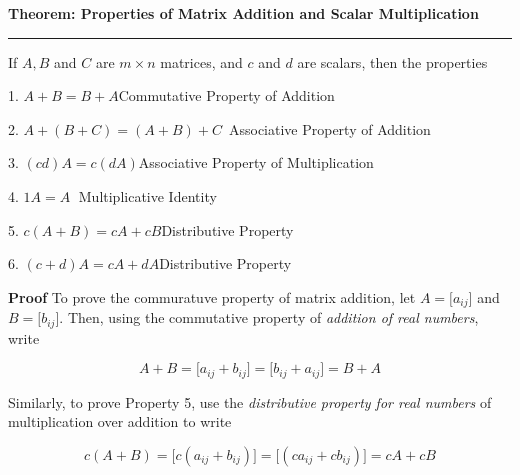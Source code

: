 \nopagenumbers
{\bf Theorem: Properties of Matrix Addition and Scalar Multiplication}
\vskip 1mm
\hrule

\vskip 6pt
If $A,B$ and $C$ are $m\times n$ matrices, and $c$ and $d$ are scalars, then the properties

\vskip 10pt
1. $A+B=B+A$\quad\quad\quad\quad\quad\quad\quad\quad Commutative Property of Addition

\vskip 6pt
2. $A+(B+C)=(A+B)+C$\quad\quad$\,$ Associative Property of Addition

\vskip 6pt
3. $(cd)A=c(dA)$\quad\quad\quad\quad\quad\quad\quad\quad\quad Associative Property of Multiplication

\vskip 6pt
4. $1A=A$\quad\quad\quad\quad\quad\quad\quad\quad\quad\quad\quad$\;$ Multiplicative Identity

\vskip 6pt
5. $c(A+B)=cA+cB$\quad\quad\quad\quad\quad\quad Distributive Property

\vskip 6pt
6. $(c+d)A=cA+dA$\quad\quad\quad\quad\quad\quad Distributive Property

\vskip 10pt
{\bf Proof}
To prove the commuratuve property of matrix addition, let $A=\lbrack a_{ij}\rbrack$ and $B=\lbrack b_{ij}\rbrack$. Then, using the commutative property of {\it addition of real numbers}, write

$$A+B=\lbrack a_{ij}+b_{ij}\rbrack=\lbrack b_{ij}+a_{ij}\rbrack=B+A$$

Similarly, to prove Property 5, use the {\it distributive property for real numbers} of multiplication over addition to write

$$c(A+B)=\bigl\lbrack c(a_{ij}+b_{ij})\bigr\rbrack=\bigl\lbrack(ca_{ij}+cb_{ij})\bigr\rbrack=cA+cB$$

\vfill\eject
\bye
